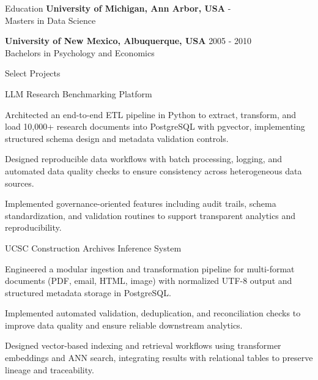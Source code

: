 \documentclass{resume}
\begin{document}
\begin{rSection}{Education}
                        \textbf{University of Michigan, Ann Arbor, USA} \hfill { - } \\
                            {Masters in Data Science}
                         
             
         
                        \textbf{University of New Mexico, Albuquerque, USA} \hfill {2005 - 2010} \\
                            {Bachelors in Psychology and Economics}
    \end{rSection}

    \begin{rSection}{Select Projects}
                    \begin{rSubsection}
                                    {LLM Research Benchmarking Platform}
                                {}{}{}
                                    \item Architected an end-to-end ETL pipeline in Python to extract, transform, and load 10,000+ research documents into PostgreSQL with pgvector, implementing structured schema design and metadata validation controls.
                                    \item Designed reproducible data workflows with batch processing, logging, and automated data quality checks to ensure consistency across heterogeneous data sources.
                                    \item Implemented governance-oriented features including audit trails, schema standardization, and validation routines to support transparent analytics and reproducibility.
                            \end{rSubsection}
                    \begin{rSubsection}
                                    {UCSC Construction Archives Inference System}
                                {}{}{}
                                    \item Engineered a modular ingestion and transformation pipeline for multi-format documents (PDF, email, HTML, image) with normalized UTF-8 output and structured metadata storage in PostgreSQL.
                                    \item Implemented automated validation, deduplication, and reconciliation checks to improve data quality and ensure reliable downstream analytics.
                                    \item Designed vector-based indexing and retrieval workflows using transformer embeddings and ANN search, integrating results with relational tables to preserve lineage and traceability.
                            \end{rSubsection}
            \end{rSection}
\end{document}
